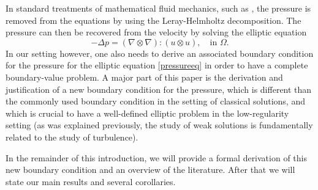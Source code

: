 \documentclass[12pt,a4paper]{article}
\theoremstyle{definition}
\theoremstyle{remark}
\numberwithin{equation}{section}
\begin{document}
In standard treatments of mathematical fluid mechanics, such as \cite{robinsonbook,constantinbook,temambook}, the pressure is removed from the equations by using the Leray-Helmholtz decomposition. The pressure can then be recovered from the velocity by solving the elliptic equation
\begin{equation} \label{pressureeq}
-\Delta p = (\nabla \otimes \nabla) : (u \otimes u), \quad \text{in } \Omega.
\end{equation}
In our setting however, one also needs to derive an associated boundary condition for the pressure for the elliptic equation \eqref{pressureeq} in order to have a complete boundary-value problem. A major part of this paper is the derivation and justification of a new boundary condition for the pressure, which is different than the commonly used boundary condition in the setting of classical solutions, and which is crucial to have a well-defined elliptic problem in the low-regularity setting (as was explained previously, the study of weak solutions is fundamentally related to the study of turbulence). 

In the remainder of this introduction, we will provide a formal derivation of this new boundary condition and an overview of the literature. After that we will state our main results and several corollaries. 
\end{document}
